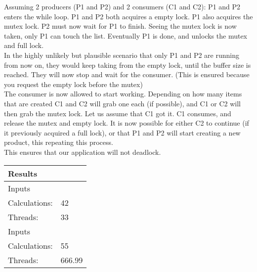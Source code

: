 Assuming 2 producers (P1 and P2) and 2 consumers (C1 and C2):
P1 and P2 enters the while loop. P1 and P2 both acquires a empty lock. P1 also acquires the mutex lock. P2 must now wait for P1 to finish.
Seeing the mutex lock is now taken, only P1 can touch the list. Eventually P1 is done, and unlocks the mutex and full lock. \\

In the highly unlikely but plausible scenario that only P1 and P2 are running from now on, they would keep taking from the empty lock, until the buffer size is reached. They will now stop and wait for the consumer. (This is ensured because you request the empty lock before the mutex)\\

The consumer is now allowed to start working. Depending on how many items that are created C1 and C2 will grab one each (if possible), and C1 or C2 will then grab the mutex lock. Let us assume that C1 got it.
C1 consumes, and release the mutex and empty lock. 
It is now possible for either C2 to continue (if it previously acquired a full lock), or that P1 and P2 will start creating a new product, this repeating this process. \\

This ensures that our application will not deadlock.



\newcommand{\rowhead}[1] {
\multicolumn{2}{l}{#1}\\
\hline
}

\newcommand{\row}[2] {
\hline
\rowcolor{gr1}
Inputs&\\
\hline \hline
\rowcolor{gr2}
Calculations: & #1 \\
\hline
\rowcolor{gr2}
Threads: & #2 \\
\hline \hline
}

\newcommand{\botrow}[2] {
\hline
\rowcolor{gr1}
Inputs&\\
\hline \hline
\rowcolor{gr2}
Calculations: & #1 \\
\hline
\rowcolor{gr2}
Threads: & #2 \\
\hline
}

\begin{table}[h]
\begin{tabular}{| p{} | p{} |}
\rowhead{Results}
\row{42}{33}
\row{55}{666.99}
\end{tabular}
\end{table}